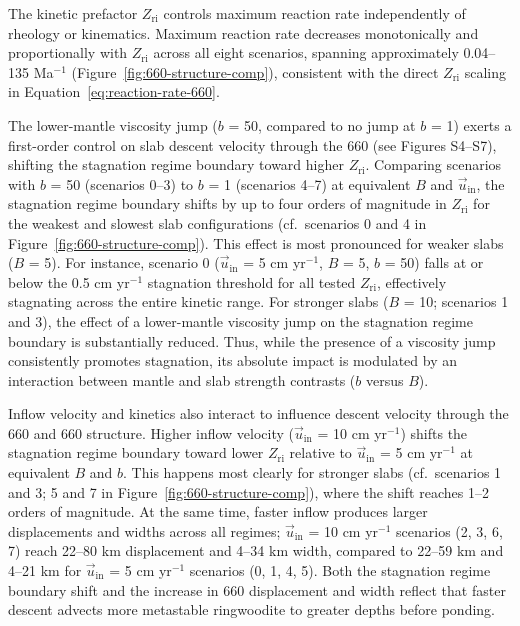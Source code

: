 \documentclass[draft,linenumbers]{agujournal2019}
\begin{document}
The kinetic prefactor \(Z_\mathrm{ri}\) controls maximum reaction rate
independently of rheology or kinematics. Maximum reaction rate decreases
monotonically and proportionally with \(Z_\mathrm{ri}\) across all eight
scenarios, spanning approximately 0.04--135 Ma\(^{-1}\)
(Figure~\ref{fig:660-structure-comp}), consistent with the direct
\(Z_\mathrm{ri}\) scaling in Equation~\ref{eq:reaction-rate-660}.

The lower-mantle viscosity jump (\(b\) = 50, compared to no jump at
\(b\) = 1) exerts a first-order control on slab descent velocity through
the 660 (see Figures S4--S7), shifting the stagnation regime boundary
toward higher \(Z_\mathrm{ri}\). Comparing scenarios with \(b\) = 50
(scenarios 0--3) to \(b\) = 1 (scenarios 4--7) at equivalent \(B\) and
\(\vec{u}_\mathrm{in}\), the stagnation regime boundary shifts by up to
four orders of magnitude in \(Z_\mathrm{ri}\) for the weakest and
slowest slab configurations (cf.~scenarios 0 and 4 in
Figure~\ref{fig:660-structure-comp}). This effect is most pronounced for
weaker slabs (\(B\) = 5). For instance, scenario 0
(\(\vec{u}_\mathrm{in}\) = 5 cm yr\(^{-1}\), \(B\) = 5, \(b\) = 50)
falls at or below the 0.5 cm yr\(^{-1}\) stagnation threshold for all
tested \(Z_\mathrm{ri}\), effectively stagnating across the entire
kinetic range. For stronger slabs (\(B\) = 10; scenarios 1 and 3), the
effect of a lower-mantle viscosity jump on the stagnation regime
boundary is substantially reduced. Thus, while the presence of a
viscosity jump consistently promotes stagnation, its absolute impact is
modulated by an interaction between mantle and slab strength contrasts
(\(b\) versus \(B\)).

Inflow velocity and kinetics also interact to influence descent velocity
through the 660 and 660 structure. Higher inflow velocity
(\(\vec{u}_\mathrm{in}\) = 10 cm yr\(^{-1}\)) shifts the stagnation
regime boundary toward lower \(Z_\mathrm{ri}\) relative to
\(\vec{u}_\mathrm{in}\) = 5 cm yr\(^{-1}\) at equivalent \(B\) and
\(b\). This happens most clearly for stronger slabs (cf.~scenarios 1 and
3; 5 and 7 in Figure~\ref{fig:660-structure-comp}), where the shift
reaches 1--2 orders of magnitude. At the same time, faster inflow
produces larger displacements and widths across all regimes;
\(\vec{u}_\mathrm{in}\) = 10 cm yr\(^{-1}\) scenarios (2, 3, 6, 7) reach
22--80 km displacement and 4--34 km width, compared to 22--59 km and
4--21 km for \(\vec{u}_\mathrm{in}\) = 5 cm yr\(^{-1}\) scenarios (0, 1,
4, 5). Both the stagnation regime boundary shift and the increase in 660
displacement and width reflect that faster descent advects more
metastable ringwoodite to greater depths before ponding.
\end{document}
